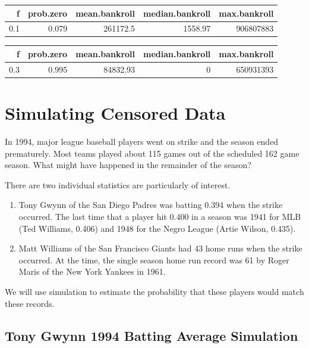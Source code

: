 \documentclass[
  11pt,
]{book}
\theoremstyle{definition}
\theoremstyle{definition}
\theoremstyle{definition}
\theoremstyle{definition}
\theoremstyle{remark}
\begin{document}
\begin{table}[H]
\centering
\begin{tabular}{rrrrr}
\toprule
f & prob.zero & mean.bankroll & median.bankroll & max.bankroll\\
\midrule
0.1 & 0.079 & 261172.5 & 1558.97 & 906807883\\
\bottomrule
\end{tabular}
\end{table}

\begin{table}[H]
\centering
\begin{tabular}{rrrrr}
\toprule
f & prob.zero & mean.bankroll & median.bankroll & max.bankroll\\
\midrule
0.3 & 0.995 & 84832.93 & 0 & 650931393\\
\bottomrule
\end{tabular}
\end{table}

\newpage

\hypertarget{simulating-censored-data}{%
\section{Simulating Censored Data}\label{simulating-censored-data}}

In 1994, major league baseball players went on strike and the season ended prematurely. Most teams played about 115 games out of the scheduled 162 game season. What might have happened in the remainder of the season?

There are two individual statistics are particularly of interest.

\begin{enumerate}
\def\labelenumi{\arabic{enumi})}
\item
  Tony Gwynn of the San Diego Padres was batting 0.394 when the strike occurred. The last time that a player hit 0.400 in a season was 1941 for MLB (Ted Williams, 0.406) and 1948 for the Negro League (Artie Wilson, 0.435).
\item
  Matt Williams of the San Francisco Giants had 43 home runs when the strike occurred. At the time, the single season home run record was 61 by Roger Maris of the New York Yankees in 1961.
\end{enumerate}

We will use simulation to estimate the probability that these players would match these records.

\hypertarget{tony-gwynn-1994-batting-average-simulation}{%
\subsection{Tony Gwynn 1994 Batting Average Simulation}\label{tony-gwynn-1994-batting-average-simulation}}
\end{document}
